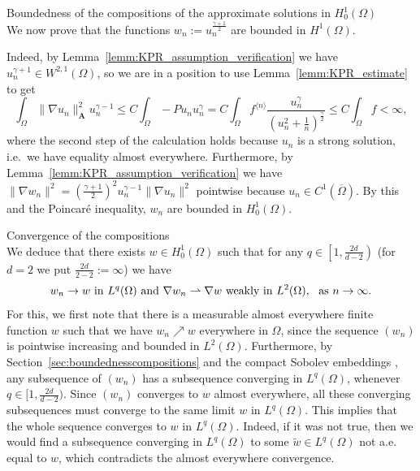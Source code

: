 \documentclass[12pt,a4paper]{amsart}
\makeatletter
\theoremstyle{definition}
\newcommand{\A}{\mathbf{A}}
\renewcommand{\subsubsection}{\@startsection{subsubsection}{3}%
    \z@{.5\linespacing\@plus.7\linespacing}{-.5em}%
    {\normalfont\bfseries}}
\makeatother
\begin{document}
\smallskip
\noindent

\subsubsection{Boundedness of the compositions of the approximate solutions in $H^1_0(\Omega)$}~\\ \label{sec:boundednesscompositions}
We now prove that the functions $w_n:= u_{n}^{\frac{\gamma +1}{2}}$ are bounded in $H^1(\Omega)$. 

Indeed, by Lemma~\ref{lemm:KPR_assumption_verification} we have $u_{n}^{\gamma +1}\in W^{2,1}(\Omega)$, so we are in a position to use Lemma~\ref{lemm:KPR_estimate} to get
\begin{equation}\label{tomasdalimil}
\int_\Omega \|\nabla u_{n}\|_\A^2 u_n^{\gamma -1} \le C
\int_\Omega -Pu_{n} u_{n}^\gamma =C\int_\Omega  f^{{\langle n \rangle}} \frac{u_{n}^\gamma }{\left(u_{n}^2 +\frac{1}{n}\right)^{\frac{\gamma }{2}}}\le C \int_\Omega  f  < \infty,
\end{equation}
where the second step of the calculation holds because $u_n$ is a strong solution, i.e.~we have equality almost everywhere. Furthermore, by Lemma~\ref{lemm:KPR_assumption_verification} we have $\lVert \nabla w_n \rVert^2 = (\frac{\gamma+1}{2})^2u_n^{\gamma-1} \lVert \nabla u_n \rVert^2$ pointwise because $u_n\in C^1 (\overline{\Omega})$. By this and the Poincar\'e inequality, $w_n$ are bounded in $H^1_0(\Omega)$.

\smallskip
\noindent
\subsubsection{Convergence of the compositions}~\\ \label{sec:convergencecompositions} 
We deduce that there exists $w\in H^1_0(\Omega)$ such that
for any $q\in \left[1,\frac{2d}{d-2}\right)$ (for $d=2$ we put $\frac{2d}{2-2} :=\infty$) we have
\begin{equation}\label{slabezbieznosci}
w_{n}\rightarrow w \ {\rm in}\ L^{q}(\Omega)\ {\rm and}\
\nabla w_{n}\rightharpoonup \nabla w \ \hbox{\rm weakly in}\ L^2(\Omega), \ \ {\rm as} \ n\to\infty .
\end{equation}
For this, we first note that there is a measurable almost everywhere finite function $w$ such that we have $w_n \nearrow w$ everywhere in $\Omega$, since the sequence $(w_n)$ is pointwise increasing and bounded in $L^2(\Omega)$. 
Furthermore, by Section~\ref{sec:boundednesscompositions} and the compact Sobolev embeddings \cite[Section~5.7]{MR1625845},  
any subsequence of $(w_{n})$ has a subsequence converging in $L^q(\Omega)$, whenever $q\in [1,\frac{2d}{d-2})$. Since $(w_n)$ converges to $w$ almost everywhere, all these converging subsequences must converge to the same limit $w$ in $L^q(\Omega)$. This implies that the whole sequence converges to $w$ in $L^q(\Omega)$. Indeed, if it was not true, then we would find a subsequence converging in $L^q(\Omega)$ to some $\widetilde{w}\in L^q(\Omega)$ not a.e. equal to $w$, which contradicts the almost everywhere convergence.
\end{document}
